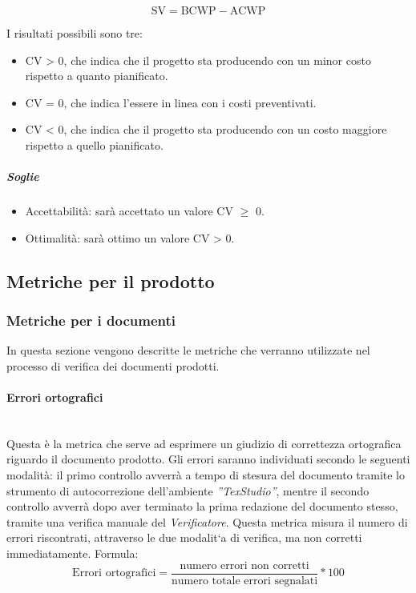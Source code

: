 	\begin{displaymath}
\mbox{SV}= \mbox{BCWP}-\mbox{ACWP}\end{displaymath}

I risultati possibili sono tre:

\begin{itemize}
\item CV > 0, che indica che il progetto sta producendo con un minor costo rispetto a quanto pianificato.
\item CV = 0, che indica l'essere in linea con i costi preventivati.
\item CV < 0, che indica che il progetto sta producendo con un costo maggiore rispetto a quello pianificato.
\end{itemize}

\subparagraph{Soglie}
\begin{itemize}
\item Accettabilità: sarà accettato un valore CV $\ge$ 0.
\item Ottimalità: sarà ottimo un valore CV > 0.
\end{itemize}

\subsection{Metriche per il prodotto}
\label{AppB:metricheProd}
\subsubsection{Metriche per i documenti}
\label{AppB:metricheDoc}
In questa sezione vengono descritte le metriche che verranno utilizzate nel processo di verifica dei documenti prodotti.
\paragraph{Errori ortografici}
\label{AppB:ErroriOrtografici}
	~\\Questa è la metrica che serve ad esprimere un giudizio di correttezza ortografica riguardo il documento prodotto. Gli errori saranno individuati secondo le seguenti modalità:
il primo controllo avverrà a tempo di stesura del documento tramite lo strumento di autocorrezione dell'ambiente \emph{''TexStudio''}, mentre il secondo controllo avverrà dopo aver terminato la prima redazione del documento stesso, tramite una verifica manuale del \emph{Verificatore}.
Questa metrica misura il numero di errori riscontrati, attraverso le due modalit`a di verifica, ma
non corretti immediatamente.
\newline Formula:
\begin{displaymath}
\mbox{Errori ortografici}= \frac{\mbox{numero errori non corretti}}{\mbox{numero totale errori segnalati}}*100
\end{displaymath}

